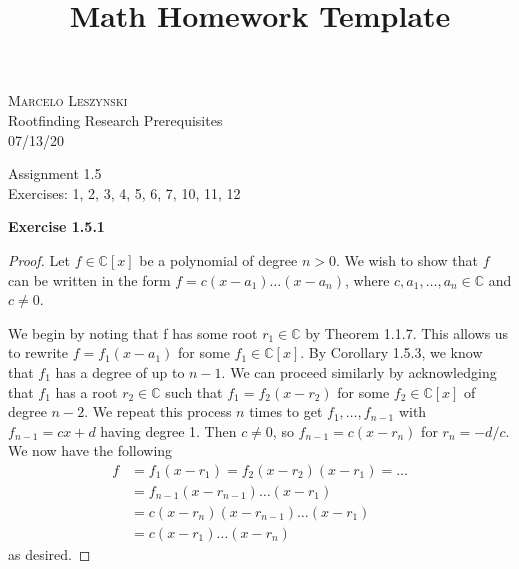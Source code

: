 \documentclass[12pt,oneside]{article}
\newenvironment{exercise}[1]{\vspace{.1in}\noindent\textbf{Exercise #1 \hspace{.05em}}}{}
\newcommand{\C}{\mathbb{C}}
\begin{document}
\title{Math Homework Template}

\begin{flushright}
\textsc{Marcelo Leszynski}  \\
Rootfinding Research Prerequisites\\
07/13/20
\end{flushright}

\begin{center}
\textsf{Assignment 1.5 } \\
\textsf{Exercises: 1, 2, 3, 4, 5, 6, 7, 10, 11, 12 }
\end{center}


\begin{exercise}{1.5.1}
    \begin{proof}
        Let $f \in \C[x]$ be a polynomial of degree $n > 0$. We wish to 
        show that $f$ can be written in the form $f=c(x-a_1)\ldots(x-a_n)$,
        where $c,a_1,\ldots,a_n \in \C$ and $c \neq 0$.

        We begin by noting that f has some root $r_1 \in \C$ by Theorem 1.1.7.
        This allows us to rewrite $f = f_1(x-a_1)$ for some $f_1 \in \C[x]$. 
        By Corollary 1.5.3, we know that $f_1$ has a degree of up to $n-1$. We 
        can proceed similarly by acknowledging that $f_1$ has a root $r_2 \in \C$
        such that $f_1 = f_2(x-r_2)$ for some $f_2 \in \C[x]$ of degree $n-2$. We 
        repeat this process $n$ times to get $f_1,\ldots,f_{n-1}$ with 
        $f_{n-1} = cx+d$ having degree 1. Then $c \neq 0$, so $f_{n-1} = c(x-r_n)$
        for $r_n = -d/c$. We now have the following
        \begin{align*}
            f   &= f_1(x-r_1) = f_2(x-r_2)(x-r_1) = \ldots \\
                &= f_{n-1}(x-r_{n-1})\ldots(x-r_1) \\
                &= c(x-r_n)(x-r_{n-1})\ldots(x-r_1) \\
                &= c(x-r_1)\ldots(x-r_n)
        \end{align*}
        as desired.
    \end{proof}
\end{exercise}

\end{document}
